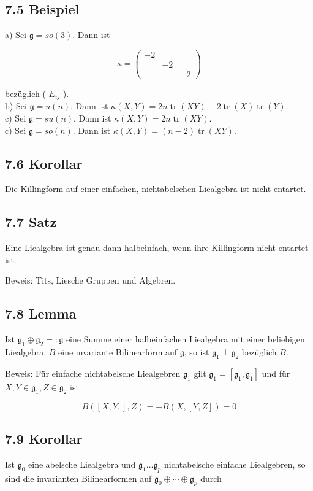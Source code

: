 \documentclass[10pt, letterpaper]{article}
\begin{document}
\subsection*{7.5 Beispiel}
a) Sei $\mathfrak{g}=s o(3)$. Dann ist

$$
\kappa=\left(\begin{array}{lll}
-2 & & \\
& -2 & \\
& & -2
\end{array}\right)
$$

bezüglich ( $E_{i j}$ ).\\
b) Sei $\mathfrak{g}=u(n)$. Dann ist $\kappa(X, Y)=2 n \operatorname{tr}(X Y)-2 \operatorname{tr}(X) \operatorname{tr}(Y)$.\\
c) Sei $\mathfrak{g}=s u(n)$. Dann ist $\kappa(X, Y)=2 n \operatorname{tr}(X Y)$.\\
c) Sei $\mathfrak{g}=s o(n)$. Dann ist $\kappa(X, Y)=(n-2) \operatorname{tr}(X Y)$.

\subsection*{7.6 Korollar}
Die Killingform auf einer einfachen, nichtabelschen Liealgebra ist nicht entartet.

\subsection*{7.7 Satz}
Eine Liealgebra ist genau dann halbeinfach, wenn ihre Killingform nicht entartet ist.

Beweis: Tits, Liesche Gruppen und Algebren.

\subsection*{7.8 Lemma}
Ist $\mathfrak{g}_{1} \oplus \mathfrak{g}_{2}=: \mathfrak{g}$ eine Summe einer halbeinfachen Liealgebra mit einer beliebigen Liealgebra, $B$ eine invariante Bilinearform auf $\mathfrak{g}$, so ist $\mathfrak{g}_{1} \perp \mathfrak{g}_{2}$ bezüglich $B$.

Beweis: Für einfache nichtabelsche Liealgebren $\mathfrak{g}_{1}$ gilt $\mathfrak{g}_{1}=\left[\mathfrak{g}_{1}, \mathfrak{g}_{1}\right]$ und für $X, Y \in \mathfrak{g}_{1}, Z \in \mathfrak{g}_{2}$ ist

$$
B([X, Y,], Z)=-B(X,[Y, Z])=0
$$

\subsection*{7.9 Korollar}
Ist $\mathfrak{g}_{0}$ eine abelsche Liealgebra und $\mathfrak{g}_{1} \ldots \mathfrak{g}_{p}$ nichtabelsche einfache Liealgebren, so sind die invarianten Bilinearformen auf $\mathfrak{g}_{0} \oplus \cdots \oplus \mathfrak{g}_{p}$ durch
\end{document}
